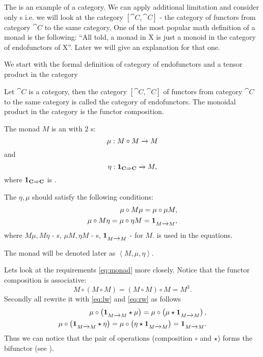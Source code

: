The  is an example of a category. We can
apply additional limitation and consider only
s i.e. we will look at the category
$[\cat{C}, \cat{C}]$ - the category of functors from category $\cat{C}$ to
the same category. One of the most popular math definition of a monad
is the following: 
``All told, a monad in X is just a monoid in the category of
endofunctors of X''\cite{bib:maclane98}.
Later we will give an explanation for that one.

We start with the formal definition of category of endofunctors and a
tensor product in the category
\begin{definition}
\label{def:category_of_endofunctors}
Let $\cat{C}$ is a category, then  the category $[\cat{C}, \cat{C}]$ of
functors from category $\cat{C}$ to the same category is called the
category of endofunctors. The monoidal product in the category is the
functor composition. 
\end{definition}

\begin{definition}[Monad]
  \label{def:monad}
  The monad $M$ is an  with 2
  s:
  \begin{equation}
    \label{eq:monad_mu}
    \mu: M \circ M \xrightarrow{.} M
  \end{equation}
  and
  \begin{equation}
    \label{eq:monad_eta}
    \eta: \mathbf{1}_{ \mathbf{C} \Rightarrow \mathbf{C} } \xrightarrow{.} M,
  \end{equation}
  where $\mathbf{1}_{ \mathbf{C} \Rightarrow \mathbf{C} }$ is .

  The $\eta, \mu$ should satisfy the following conditions:
  \begin{eqnarray}
    \mu \circ M \mu = \mu \circ \mu M, 
    \nonumber \\
    \mu \circ M \eta = \mu \circ \eta M = \mathbf{1}_{ M \xrightarrow{.} M },
    \label{eq:monad}
  \end{eqnarray}
  where $M \mu, M \eta$ - s, $\mu M, \eta M$ -
  s, $\mathbf{1}_{ M \xrightarrow{.} M }$ -  for $M$.
   is used in the equations.

  The monad will be denoted later as $\left<M, \mu, \eta\right>$.
\end{definition}

Lets look at the requirements \eqref{eq:monad} more closely. Notice
that the functor composition is associative:
\[
M \circ ( M \circ M ) = (M \circ M) \circ M = M^3.
\]
Secondly 
all rewrite it with \eqref{eq:lw} and \eqref{eq:rw} as follows
\begin{eqnarray}
  \mu \circ \left( \mathbf{1}_{ M \xrightarrow{.} M } \star \mu \right) = 
  \mu \circ \left( \mu \star \mathbf{1}_{ M \xrightarrow{.} M } \right), 
  \nonumber \\
  \mu \circ \left( \mathbf{1}_{ M \xrightarrow{.} M } \star \eta \right) = 
  \mu \circ \left( \eta \star \mathbf{1}_{ M \xrightarrow{.} M } \right) = \mathbf{1}_{ M \xrightarrow{.} M }.
  \label{eq:monad_p1}
\end{eqnarray}
Thus we can notice that the pair of operations (composition $\circ$
and  $\star$) forms the bifunctor (see
). 

